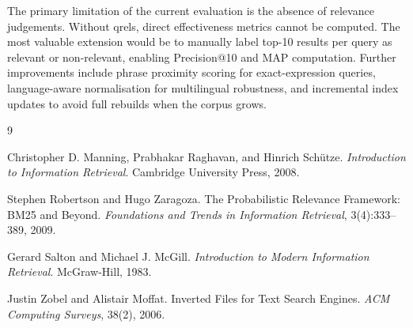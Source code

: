 \documentclass[sigconf]{acmart}
\begin{document}
The primary limitation of the current evaluation is the absence of relevance judgements. Without qrels, direct effectiveness metrics cannot be computed. The most valuable extension would be to manually label top-10 results per query as relevant or non-relevant, enabling Precision@10 and MAP computation. Further improvements include phrase proximity scoring for exact-expression queries, language-aware normalisation for multilingual robustness, and incremental index updates to avoid full rebuilds when the corpus grows.

\begin{thebibliography}{9}

Christopher D. Manning, Prabhakar Raghavan, and Hinrich Sch\"{u}tze.
\newblock \textit{Introduction to Information Retrieval}.
\newblock Cambridge University Press, 2008.

Stephen Robertson and Hugo Zaragoza.
\newblock The Probabilistic Relevance Framework: BM25 and Beyond.
\newblock \textit{Foundations and Trends in Information Retrieval}, 3(4):333--389, 2009.

Gerard Salton and Michael J. McGill.
\newblock \textit{Introduction to Modern Information Retrieval}.
\newblock McGraw-Hill, 1983.

Justin Zobel and Alistair Moffat.
\newblock Inverted Files for Text Search Engines.
\newblock \textit{ACM Computing Surveys}, 38(2), 2006.

\end{thebibliography}
\end{document}
